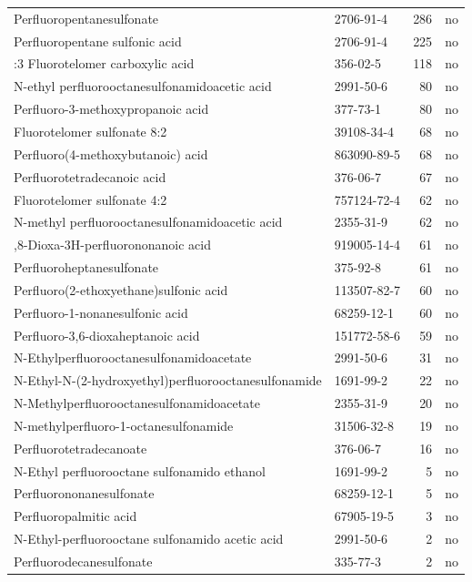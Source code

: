 \begin{longtable}{@{}>{\raggedright\arraybackslash}p{72mm} l r c@{}}
\sloppy Perfluoropentanesulfonate & 2706-91-4 & 286 & no \\
\sloppy Perfluoropentane sulfonic acid & 2706-91-4 & 225 & no \\
\sloppy 3:3 Fluorotelomer carboxylic acid & 356-02-5 & 118 & no \\
\sloppy N-ethyl perfluorooctanesulfonamidoacetic acid & 2991-50-6 & 80 & no \\
\sloppy Perfluoro-3-methoxypropanoic acid & 377-73-1 & 80 & no \\
\sloppy Fluorotelomer sulfonate 8:2 & 39108-34-4 & 68 & no \\
\sloppy Perfluoro(4-methoxybutanoic) acid & 863090-89-5 & 68 & no \\
\sloppy Perfluorotetradecanoic acid & 376-06-7 & 67 & no \\
\sloppy Fluorotelomer sulfonate 4:2 & 757124-72-4 & 62 & no \\
\sloppy N-methyl perfluorooctanesulfonamidoacetic acid & 2355-31-9 & 62 & no \\
\sloppy 4,8-Dioxa-3H-perfluorononanoic acid & 919005-14-4 & 61 & no \\
\sloppy Perfluoroheptanesulfonate & 375-92-8 & 61 & no \\
\sloppy Perfluoro(2-ethoxyethane)sulfonic acid & 113507-82-7 & 60 & no \\
\sloppy Perfluoro-1-nonanesulfonic acid & 68259-12-1 & 60 & no \\
\sloppy Perfluoro-3,6-dioxaheptanoic acid & 151772-58-6 & 59 & no \\
\sloppy N-Ethylperfluorooctanesulfonamidoacetate & 2991-50-6 & 31 & no \\
\sloppy N-Ethyl-N-(2-hydroxyethyl)perfluorooctanesulfonamide & 1691-99-2 & 22 & no \\
\sloppy N-Methylperfluorooctanesulfonamidoacetate & 2355-31-9 & 20 & no \\
\sloppy N-methylperfluoro-1-octanesulfonamide & 31506-32-8 & 19 & no \\
\sloppy Perfluorotetradecanoate & 376-06-7 & 16 & no \\
\sloppy N-Ethyl perfluorooctane sulfonamido ethanol & 1691-99-2 & 5 & no \\
\sloppy Perfluorononanesulfonate & 68259-12-1 & 5 & no \\
\sloppy Perfluoropalmitic acid & 67905-19-5 & 3 & no \\
\sloppy N-Ethyl-perfluorooctane sulfonamido acetic acid & 2991-50-6 & 2 & no \\
\sloppy Perfluorodecanesulfonate & 335-77-3 & 2 & no \\
\end{longtable}
